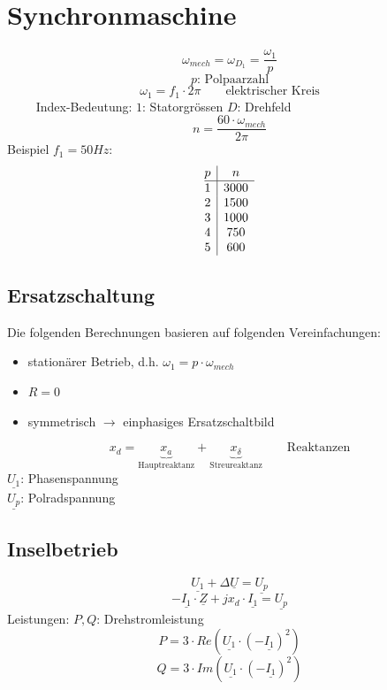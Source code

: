 \section{Synchronmaschine}
\[ \omega_{mech} = \omega_{D_1} = \frac{\omega_1}{p} \]
\[ p\text{: Polpaarzahl} \]
\[ \omega_1 = f_1 \cdot 2 \pi \qquad \text{elektrischer Kreis} \]
$\qquad$ Index-Bedeutung: $1$: Statorgrössen $D$: Drehfeld
\[ n = \frac{60 \cdot \omega_{mech}}{2 \pi} \]
Beispiel $f_1 = 50 Hz$: 
\[ \begin{array}{@{}c|c}
p & n    \\
\hline
1 & 3000 \\
2 & 1500 \\
3 & 1000 \\
4 & 750  \\
5 & 600  \\
\end{array} \]

\subsection{Ersatzschaltung}
Die folgenden Berechnungen basieren auf folgenden Vereinfachungen: 
\begin{itemize}
  \item stationärer Betrieb, d.h. $\omega_1 = p \cdot \omega_{mech}$
  \item $R = 0$
  \item symmetrisch $\rightarrow$ einphasiges Ersatzschaltbild
\end{itemize}
\[ x_d = \underbrace{x_a}_{\text{Hauptreaktanz}} + \underbrace{x_{\delta}}
_{\text{Streureaktanz}}\qquad \text{Reaktanzen} \]
$\underline{U_1}$: Phasenspannung \\
$\underline{U_p}$: Polradspannung

\subsection{Inselbetrieb}
\[ \underline{U_1} + \Delta \underline{U} = \underline{U_p} \]
\[ -\underline{I_1} \cdot \underline{Z} + j x_d \cdot \underline{I_1} 
= \underline{U_p} \]
Leistungen: $P, Q$: Drehstromleistung
\[ P = 3 \cdot Re(\underline{U_1} \cdot (-\underline{I_1})^2) \]
\[ Q = 3 \cdot Im(\underline{U_1} \cdot (-\underline{I_1})^2) \]

